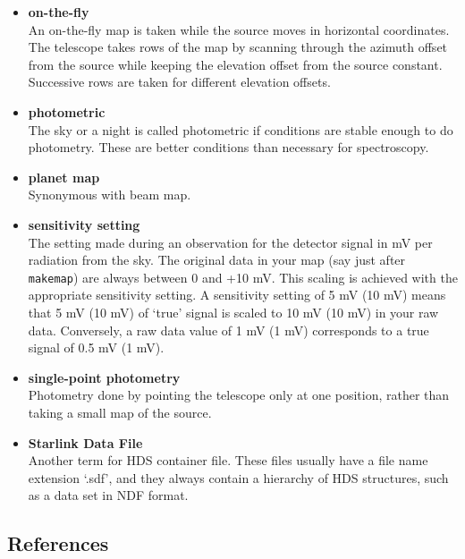 \documentclass[11pt,noabs]{starlink}
\begin{document}
\begin{itemize}
\item\textbf{\label{glossonthefly}on-the-fly}\\
   An on-the-fly map is taken while
   the source moves in horizontal coordinates. The telescope takes rows
   of the map by scanning through the azimuth offset from the source
   while keeping the elevation offset from the source constant.
   Successive rows are taken for different elevation offsets.

\item\textbf{\label{glossphotometric}photometric}\\
   The sky or a night is called
   photometric if conditions are stable enough to do photometry. These
   are better conditions than necessary for spectroscopy.

\item\textbf{\label{glossplanetmap}planet map}\\
   Synonymous with beam map.

\item\textbf{\label{glosssensset}sensitivity setting}\\
   The setting made during
   an observation for the detector signal in mV per radiation from the
   sky. The original data in your map (say just after \texttt{makemap}) are
   always between 0 and +10 mV. This scaling is achieved with the
   appropriate sensitivity setting. A sensitivity setting of 5 mV (10
   mV) means that 5 mV (10 mV) of `true' signal is scaled to 10 mV (10
   mV) in your raw data. Conversely, a raw data value of 1 mV (1 mV)
   corresponds to a true signal of 0.5 mV (1 mV).

\item\textbf{\label{glosssinglepoint}single-point photometry}\\
   Photometry done
   by pointing the telescope only at one position, rather than taking a
   small map of the source.

\item\textbf{\label{glosssdf}Starlink Data File}\\
   Another term for HDS container
   file. These files usually have a file name extension `.sdf', and they
   always contain a hierarchy of HDS structures, such as a data set in
   NDF format.

\end{itemize}


\subsection{\label{refer}References}
\end{document}
